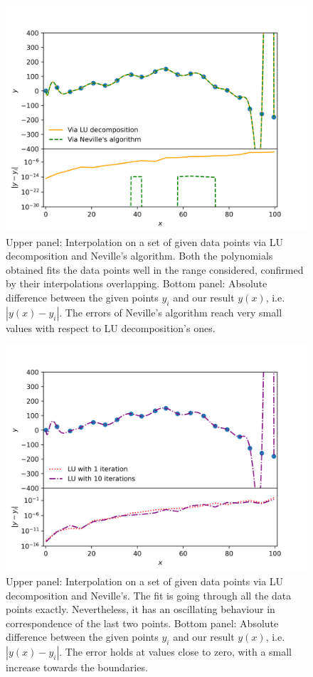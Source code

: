 \begin{figure}[h!]
  \centering
  \includegraphics[width=0.9\linewidth]{./plots/my_vandermonde_sol_2b.png}
  \caption{Upper panel: Interpolation on a set of given data points via LU decomposition and Neville's algorithm. Both the polynomials obtained fits the data points well in the range considered, confirmed by their interpolations overlapping. Bottom panel: Absolute difference between the given points $y_i$ and our result $y(x)$, i.e. $|y(x) - y_{i}|$. The errors of Neville's algorithm reach very small values with respect to LU decomposition's ones. }
  \label{fig:neville}
\end{figure}

\begin{figure}[h!]
  \centering
  \includegraphics[width=0.9\linewidth]{./plots/my_vandermonde_sol_2c.png}
  \caption{Upper panel: Interpolation on a set of given data points via LU decomposition and Neville's. The fit is going through all the data points exactly. Nevertheless, it has an oscillating behaviour in correspondence of the last two points. Bottom panel: Absolute difference between the given points $y_i$ and our result $y(x)$, i.e. $|y(x) - y_{i}|$. The error holds at values close to zero, with a small increase towards the boundaries.}
  \label{fig:lu_iter}
\end{figure}
